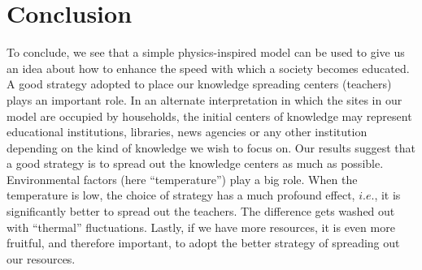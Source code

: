 \documentclass[a4paper,12pt]{article}
\begin{document}
\section{Conclusion}
To conclude,
we see that a simple physics-inspired model can be used to
give us an idea about how to enhance the speed with which a society becomes
educated. A good strategy adopted to place our knowledge spreading centers
(teachers) plays an important role.
In an alternate interpretation in which the sites in our model are occupied by households,
the initial centers of knowledge may represent educational institutions,
libraries, news agencies or any other institution depending on the kind of
knowledge we wish to focus on.
Our results suggest that a good strategy is to spread out the knowledge centers
as much as possible.
Environmental factors (here ``temperature'') play a big role.
When the temperature is low, the choice of strategy has a much profound effect, $i.e.$,
it is significantly better to spread out the teachers.
The difference gets washed out with ``thermal'' fluctuations.
Lastly, if we have more resources, it is even more fruitful, and therefore important, to
adopt the better strategy of spreading out our resources.
\end{document}
